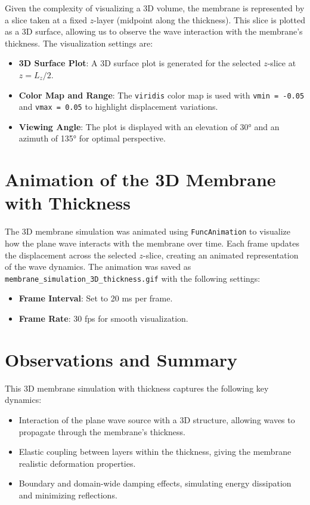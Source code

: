 \documentclass{article}
\begin{document}
Given the complexity of visualizing a 3D volume, the membrane is represented by a slice taken at a fixed $z$-layer (midpoint along the thickness). This slice is plotted as a 3D surface, allowing us to observe the wave interaction with the membrane’s thickness. The visualization settings are:
\begin{itemize}
    \item \textbf{3D Surface Plot}: A 3D surface plot is generated for the selected $z$-slice at $z = L_z / 2$.
    \item \textbf{Color Map and Range}: The \texttt{viridis} color map is used with \texttt{vmin = -0.05} and \texttt{vmax = 0.05} to highlight displacement variations.
    \item \textbf{Viewing Angle}: The plot is displayed with an elevation of 30° and an azimuth of 135° for optimal perspective.
\end{itemize}

\section{Animation of the 3D Membrane with Thickness}

The 3D membrane simulation was animated using \texttt{FuncAnimation} to visualize how the plane wave interacts with the membrane over time. Each frame updates the displacement across the selected $z$-slice, creating an animated representation of the wave dynamics. The animation was saved as \texttt{membrane\_simulation\_3D\_thickness.gif} with the following settings:
\begin{itemize}
    \item \textbf{Frame Interval}: Set to 20 ms per frame.
    \item \textbf{Frame Rate}: 30 fps for smooth visualization.
\end{itemize}

\section{Observations and Summary}

This 3D membrane simulation with thickness captures the following key dynamics:
\begin{itemize}
    \item Interaction of the plane wave source with a 3D structure, allowing waves to propagate through the membrane’s thickness.
    \item Elastic coupling between layers within the thickness, giving the membrane realistic deformation properties.
    \item Boundary and domain-wide damping effects, simulating energy dissipation and minimizing reflections.
\end{itemize}
\end{document}
